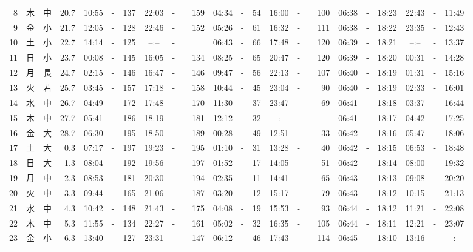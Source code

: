 \documentclass[12pt,a4j]{jsarticle}
\begin{document}
\begin{table}[htbp]
\begin{center}
{\begin{tabular}{|rc|cr|ccrccr|ccrccr|ccc|ccc|}
 8 & 木 & 中 & 20.7 &  10:55 &-& 137 &  22:03 &-& 159 &  04:34 &-&  54 &  16:00 &-& 100 & 06:38 & -& 18:23 & 22:43 & -& 11:49 \\
 9 & 金 & 小 & 21.7 &  12:05 &-& 128 &  22:46 &-& 152 &  05:26 &-&  61 &  16:32 &-& 111 & 06:38 & -& 18:22 & 23:35 & -& 12:43 \\
10 & 土 & 小 & 22.7 &  14:14 &-& 125 &  --:-- &-&~~~~~ &  06:43 &-&  66 &  17:48 &-& 120 & 06:39 & -& 18:21 & --:-- & -& 13:37 \\
11 & 日 & 小 & 23.7 &  00:08 &-& 145 &  16:05 &-& 134 &  08:25 &-&  65 &  20:47 &-& 120 & 06:39 & -& 18:20 & 00:31 & -& 14:28 \\
12 & 月 & 長 & 24.7 &  02:15 &-& 146 &  16:47 &-& 146 &  09:47 &-&  56 &  22:13 &-& 107 & 06:40 & -& 18:19 & 01:31 & -& 15:16 \\
13 & 火 & 若 & 25.7 &  03:45 &-& 157 &  17:18 &-& 158 &  10:44 &-&  45 &  23:04 &-&  90 & 06:40 & -& 18:19 & 02:33 & -& 16:01 \\
14 & 水 & 中 & 26.7 &  04:49 &-& 172 &  17:48 &-& 170 &  11:30 &-&  37 &  23:47 &-&  69 & 06:41 & -& 18:18 & 03:37 & -& 16:44 \\
15 & 木 & 中 & 27.7 &  05:41 &-& 186 &  18:19 &-& 181 &  12:12 &-&  32 &  --:-- &-&~~~~~ & 06:41 & -& 18:17 & 04:42 & -& 17:25 \\
16 & 金 & 大 & 28.7 &  06:30 &-& 195 &  18:50 &-& 189 &  00:28 &-&  49 &  12:51 &-&  33 & 06:42 & -& 18:16 & 05:47 & -& 18:06 \\
17 & 土 & 大 &  0.3 &  07:17 &-& 197 &  19:23 &-& 195 &  01:10 &-&  31 &  13:28 &-&  40 & 06:42 & -& 18:15 & 06:53 & -& 18:48 \\
18 & 日 & 大 &  1.3 &  08:04 &-& 192 &  19:56 &-& 197 &  01:52 &-&  17 &  14:05 &-&  51 & 06:42 & -& 18:14 & 08:00 & -& 19:32 \\
19 & 月 & 中 &  2.3 &  08:53 &-& 181 &  20:30 &-& 194 &  02:35 &-&  11 &  14:41 &-&  65 & 06:43 & -& 18:13 & 09:08 & -& 20:20 \\
20 & 火 & 中 &  3.3 &  09:44 &-& 165 &  21:06 &-& 187 &  03:20 &-&  12 &  15:17 &-&  79 & 06:43 & -& 18:12 & 10:15 & -& 21:13 \\
21 & 水 & 中 &  4.3 &  10:42 &-& 148 &  21:43 &-& 175 &  04:08 &-&  19 &  15:53 &-&  93 & 06:44 & -& 18:12 & 11:21 & -& 22:08 \\
22 & 木 & 中 &  5.3 &  11:55 &-& 134 &  22:27 &-& 161 &  05:02 &-&  32 &  16:35 &-& 105 & 06:44 & -& 18:11 & 12:21 & -& 23:07 \\
23 & 金 & 小 &  6.3 &  13:40 &-& 127 &  23:31 &-& 147 &  06:12 &-&  46 &  17:43 &-& 114 & 06:45 & -& 18:10 & 13:16 & -& --:-- \\

\end{tabular}}
\end{center}
\end{table}
\end{document}
